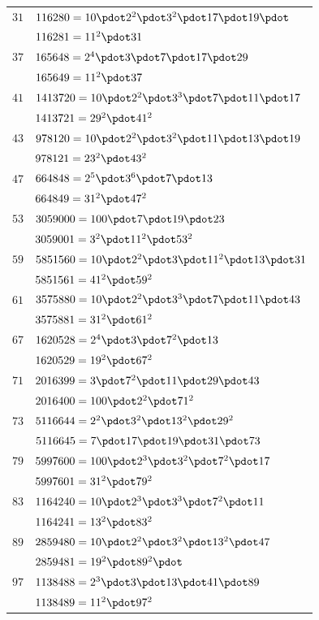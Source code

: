 \par{}%
\begingroup\renewcommand{\arraystretch}{1.08}
\begin{longtable}{@{}rl@{}}
$31$ & $116280=10\pdot 2^{2}\pdot 3^{2}\pdot 17\pdot 19\pdot$\\
 & $116281=11^{2}\pdot 31$\\
$37$ & $165648=2^{4}\pdot 3\pdot 7\pdot 17\pdot 29$\\
 & $165649=11^{2}\pdot 37$\\
$41$ & $1413720=10\pdot 2^{2}\pdot 3^{3}\pdot 7\pdot 11\pdot 17$\\
 & $1413721=29^{2}\pdot 41^{2}$\\
$43$ & $978120=10\pdot 2^{2}\pdot 3^{2}\pdot 11\pdot 13\pdot 19$\\
 & $978121=23^{2}\pdot 43^{2}$\\
$47$ & $664848=2^{5}\pdot 3^{6}\pdot 7\pdot 13$\\
 & $664849=31^{2}\pdot 47^{2}$\\
$53$ & $3059000=100\pdot 7\pdot 19\pdot 23$\\
 & $3059001=3^{2}\pdot 11^{2}\pdot 53^{2}$\\
$59$ & $5851560=10\pdot 2^{2}\pdot 3\pdot 11^{2}\pdot 13\pdot 31$\\
 & $5851561=41^{2}\pdot 59^{2}$\\
$61$ & $3575880=10\pdot 2^{2}\pdot 3^{3}\pdot 7\pdot 11\pdot 43$\\
 & $3575881=31^{2}\pdot 61^{2}$\\
$67$ & $1620528=2^{4}\pdot 3\pdot 7^{2}\pdot 13$\\
 & $1620529=19^{2}\pdot 67^{2}$\\
$71$ & $2016399=3\pdot 7^{2}\pdot 11\pdot 29\pdot 43$\\
 & $2016400=100\pdot 2^{2}\pdot 71^{2}$\\
$73$ & $5116644=2^{2}\pdot 3^{2}\pdot 13^{2}\pdot 29^{2}$\\
 & $5116645=7\pdot 17\pdot 19\pdot 31\pdot 73$\\
$79$ & $5997600=100\pdot 2^{3}\pdot 3^{2}\pdot 7^{2}\pdot 17$\\
 & $5997601=31^{2}\pdot 79^{2}$\\
$83$ & $1164240=10\pdot 2^{3}\pdot 3^{3}\pdot 7^{2}\pdot 11$\\
 & $1164241=13^{2}\pdot 83^{2}$\\
$89$ & $2859480=10\pdot 2^{2}\pdot 3^{2}\pdot 13^{2}\pdot 47$\\
 & $2859481=19^{2}\pdot 89^{2}\pdot$\\
$97$ & $1138488=2^{3}\pdot 3\pdot 13\pdot 41\pdot 89$\\
 & $1138489=11^{2}\pdot 97^{2}$\\
\end{longtable}\endgroup
